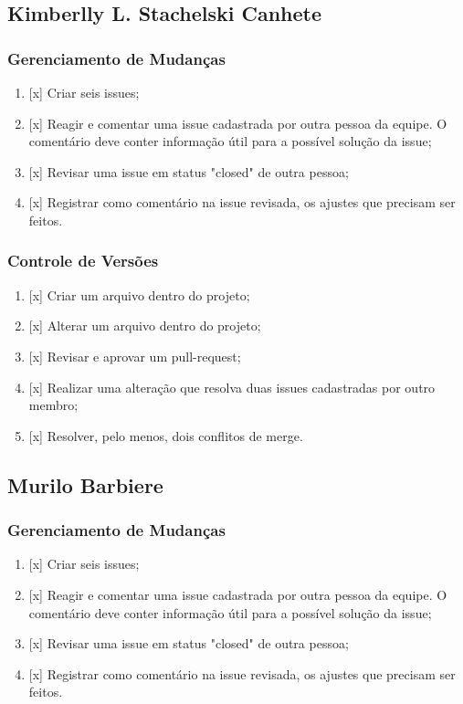 \documentclass[12pt]{article}
\begin{document}
\subsection{Kimberlly L. Stachelski Canhete}
    \subsubsection{Gerenciamento de Mudanças}
        \begin{enumerate}
            \item {[x] Criar seis issues;}
            \item {[x] Reagir e comentar uma issue cadastrada por outra pessoa da equipe. O comentário deve conter informação útil para a possível solução da issue;}
            \item {[x] Revisar uma issue em status "closed" de outra pessoa;}
            \item {[x] Registrar como comentário na issue revisada, os ajustes que precisam ser feitos.}
        \end{enumerate}

    \subsubsection{Controle de Versões}
        \begin{enumerate}
            \item {[x] Criar um arquivo dentro do projeto;} 
            \item {[x] Alterar um arquivo dentro do projeto;}
            \item {[x] Revisar e aprovar um pull-request;}
            \item {[x] Realizar uma alteração que resolva duas issues cadastradas por outro membro;}
            \item {[x] Resolver, pelo menos, dois conflitos de merge.}
        \end{enumerate}

\subsection{Murilo Barbiere}
    \subsubsection{Gerenciamento de Mudanças}
        \begin{enumerate}
            \item {[x] Criar seis issues;}
            \item {[x] Reagir e comentar uma issue cadastrada por outra pessoa da equipe. O comentário deve conter informação útil para a possível solução da issue;}
            \item {[x] Revisar uma issue em status "closed" de outra pessoa;}
            \item {[x] Registrar como comentário na issue revisada, os ajustes que precisam ser feitos.}
        \end{enumerate}
     
\end{document}
